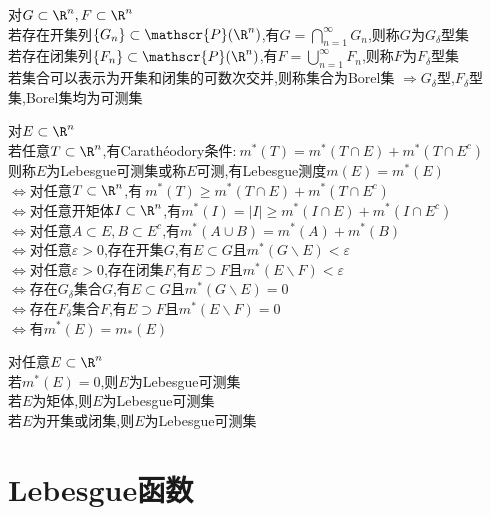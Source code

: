 \begin{dingyi}
对$G\subset\R^n,F\subset\R^n$\\
若存在开集列$\{G_n\}\subset\mathscr{P}(\R^n)$,有$G=\bigcap\limits_{n=1}^{\infty}G_n$,则称$G$为$G_{\delta}$型集\\
若存在闭集列$\{F_n\}\subset\mathscr{P}(\R^n)$,有$F=\bigcup\limits_{n=1}^{\infty}F_n$,则称$F$为$F_{\delta}$型集\\
若集合可以表示为开集和闭集的可数次交并,则称集合为Borel集
$\Rightarrow$$G_{\delta}$型,$F_{\delta}$型集,Borel集均为可测集
\end{dingyi}

\begin{dingyi}
对$E\subset\R^n$\\
若任意$T\subset\R^n$,有Carathéodory条件:$\ m^*(T)=m^*(T\cap E)+m^*(T\cap E^c)$\\
则称$E$为Lebesgue可测集或称$E$可测,有Lebesgue测度$m(E)=m^*(E)$\\
$\Leftrightarrow$对任意$T\subset\R^n$,有$\ m^*(T)\geq m^*(T\cap E)+m^*(T\cap E^c)$\\
$\Leftrightarrow$对任意开矩体$I\subset\R^n$,有$m^*(I)=|I|\geq m^*(I\cap E)+m^*(I\cap E^c)$\\
$\Leftrightarrow$对任意$A\subset E,B\subset E^c$,有$m^*(A\cup B)=m^*(A)+m^*(B)$\\
$\Leftrightarrow$对任意$\varepsilon>0$,存在开集$G$,有$E\subset G$且$m^*(G\backslash E)<\varepsilon$\\
$\Leftrightarrow$对任意$\varepsilon>0$,存在闭集$F$,有$E\supset F$且$m^*(E\backslash F)<\varepsilon$\\
$\Leftrightarrow$存在$G_{\delta}$集合$G$,有$E\subset G$且$m^*(G\backslash E)=0$\\
$\Leftrightarrow$存在$F_{\delta}$集合$F$,有$E\supset F$且$m^*(E\backslash F)=0$\\
$\Leftrightarrow$有$m^*(E)=m_*(E)$
\end{dingyi}

\begin{dingli}
对任意$E\subset \R^n$\\
若$m^*(E)=0$,则$E$为Lebesgue可测集\\
若$E$为矩体,则$E$为Lebesgue可测集\\
若$E$为开集或闭集,则$E$为Lebesgue可测集
\end{dingli}

\chapter{Lebesgue函数}

